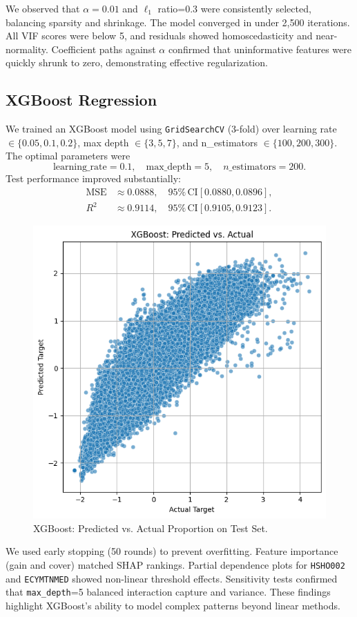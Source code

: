 \documentclass{article}
\begin{document}
We observed that $\alpha=0.01$ and $\ell_1$ ratio=0.3 were consistently selected, balancing sparsity and shrinkage. The model converged in under 2,500 iterations. All VIF scores were below 5, and residuals showed homoscedasticity and near-normality. Coefficient paths against $\alpha$ confirmed that uninformative features were quickly shrunk to zero, demonstrating effective regularization.

\subsection{XGBoost Regression}
We trained an XGBoost model using \texttt{GridSearchCV} (3-fold) over learning rate $\in\{0.05,0.1,0.2\}$, max depth $\in\{3,5,7\}$, and n\_estimators $\in\{100,200,300\}$. The optimal parameters were
\[
  \text{learning\_rate}=0.1,
  \quad \text{max\_depth}=5,
  \quad n\_\mathrm{estimators}=200.
\]
Test performance improved substantially:
\begin{align*}
  \mathrm{MSE} &\approx 0.0888, \quad 95\%\,\mathrm{CI}[0.0880,0.0896], \\
  R^2 &\approx 0.9114, \quad 95\%\,\mathrm{CI}[0.9105,0.9123].
\end{align*}

\begin{figure}[ht]
  \centering
  \includegraphics[width=0.75\linewidth]{figures/xgb_scatter.png}
  \caption{XGBoost: Predicted vs. Actual Proportion on Test Set.}
  \label{fig:xgb_scatter}
\end{figure}

We used early stopping (50 rounds) to prevent overfitting. Feature importance (gain and cover) matched SHAP rankings. Partial dependence plots for \texttt{HSHO002} and \texttt{ECYMTNMED} showed non-linear threshold effects. Sensitivity tests confirmed that \texttt{max\_depth}=5 balanced interaction capture and variance. These findings highlight XGBoost’s ability to model complex patterns beyond linear methods.
\end{document}
